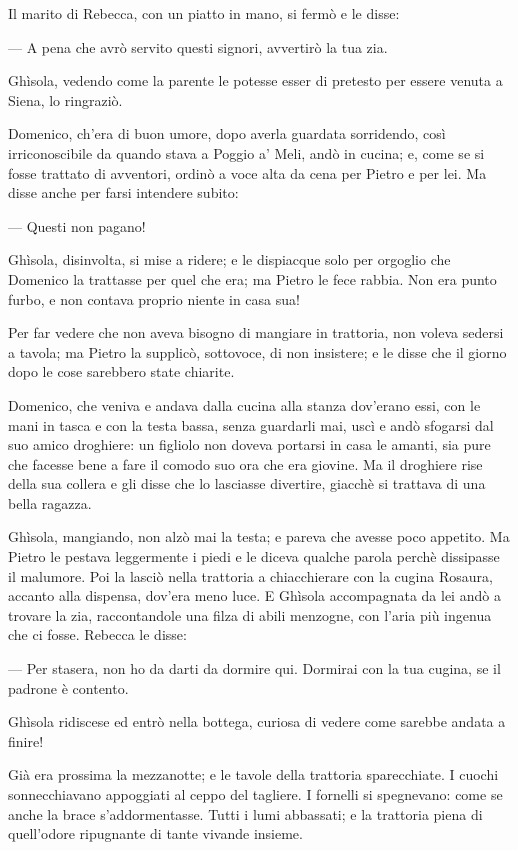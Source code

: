 Il marito di Rebecca, con un piatto in mano, si fermò e le disse:

— A pena che avrò servito questi signori, avvertirò la tua zia.

Ghìsola, vedendo come la parente le potesse esser di pretesto per essere venuta a Siena, lo ringraziò.

Domenico, ch’era di buon umore, dopo averla guardata sorridendo, così irriconoscibile da quando stava a Poggio a’ Meli, andò in cucina; e, come se si fosse trattato di avventori, ordinò a voce alta da cena per Pietro e per lei. Ma disse anche per farsi intendere subito:

— Questi non pagano!

Ghìsola, disinvolta, si mise a ridere; e le dispiacque solo per orgoglio che Domenico la trattasse per quel che era; ma Pietro le fece rabbia. Non era punto furbo, e non contava proprio niente in casa sua!

Per far vedere che non aveva bisogno di mangiare in trattoria, non voleva sedersi a tavola; ma Pietro la supplicò, sottovoce, di non insistere; e le disse che il giorno dopo le cose sarebbero state chiarite.

Domenico, che veniva e andava dalla cucina alla stanza dov’erano essi, con le mani in tasca e con la testa bassa, senza guardarli mai, uscì e andò sfogarsi dal suo amico droghiere: un figliolo non doveva portarsi in casa le amanti, sia pure che facesse bene a fare il comodo suo ora che era giovine. Ma il droghiere rise della sua collera e gli disse che lo lasciasse divertire, giacchè si trattava di una bella ragazza.

Ghìsola, mangiando, non alzò mai la testa; e pareva che avesse poco appetito. Ma Pietro le pestava leggermente i piedi e le diceva qualche parola perchè dissipasse il malumore. Poi la lasciò nella trattoria a chiacchierare con la cugina Rosaura, accanto alla dispensa, dov’era meno luce. E Ghìsola accompagnata da lei andò a trovare la zia, raccontandole una filza di abili menzogne, con l'aria più ingenua che ci fosse. Rebecca le disse:

— Per stasera, non ho da darti da dormire qui. Dormirai con la tua cugina, se il padrone è contento.

Ghìsola ridiscese ed entrò nella bottega, curiosa di vedere come sarebbe andata a finire!

Già era prossima la mezzanotte; e le tavole della trattoria sparecchiate. I cuochi sonnecchiavano appoggiati al ceppo del tagliere. I fornelli si spegnevano: come se anche la brace s’addormentasse. Tutti i lumi abbassati; e la trattoria piena di quell’odore ripugnante di tante vivande insieme.

